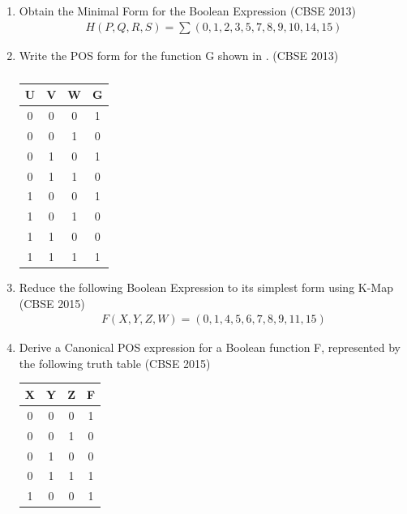 \begin{enumerate}[label=\arabic*.,ref=\theenumi]
	\item 		Obtain the Minimal Form for the Boolean Expression
\hfill (CBSE 2013)
\label{prob:2013/d/6/d}
		\begin{align}
\label{eq:2013/d/6/d}
H(P,Q,R,S)=\sum(0,1,2,3,5,7,8,9,10,14,15)
		\end{align}
	\item Write the POS form for the function G shown in 
.
\hfill (CBSE 2013)
\label{prob:2013/c/6/d}
		\begin{table}[!ht]
			\centering
		\begin{tabular}{ |c |c |c |c |}
 \hline
 U  &  V  &  W  &  G\\
 \hline
 0  &  0  &  0  &  1\\
 \hline
 0  &  0  &  1  &  0\\
 \hline
 0  &  1  &  0  &  1\\
 \hline
 0  &  1  &  1  &  0\\
 \hline
 1  &  0  &  0  &  1\\
 \hline
 1  &  0  &  1  &  0\\
 \hline
 1  &  1  &  0  &  0\\
 \hline
 1  &  1  &  1  &  1\\
 \hline
 \end{tabular}
			\caption{}
\label{tab:2013/c/6/d}
 \end{table}
	\item Reduce the following Boolean Expression to its simplest form using K-Map 
\hfill (CBSE 2015)
\label{prob:2015-1/c/6/d}
		\begin{align}
\label{eq:2015-1/c/6/d}
			F(X,Y,Z,W)=(0,1,4,5,6,7,8,9,11,15)
		\end{align}
	\item 
		Derive a Canonical POS expression for a Boolean function F, represented by the following truth table 
\label{prob:2015-1/c/6/c}
\hfill (CBSE 2015)
		\begin{table}[!ht]
			\centering
		\begin{tabular}{|c|c|c|c|}
	\hline
X & Y & Z & F \\
\hline
0 & 0 & 0 & 1 \\  
\hline
0 & 0 & 1 & 0 \\ 
\hline
0 & 1 & 0 & 0 \\
\hline
0 & 1 & 1 & 1 \\
\hline
1 & 0 & 0 & 1 \\  

\end{tabular}
\end{table}
\end{enumerate}
